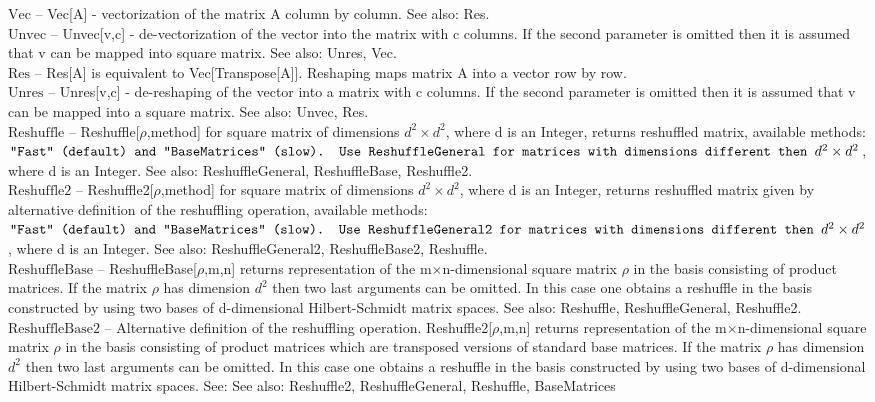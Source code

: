 \documentclass[a4paper,10pt]{scrartcl}
\begin{document}
\noindent\textbf{$ \text{Vec} $ }-- Vec[A] - vectorization of the matrix A column by column. See also: Res.$  $\\[8pt]
\noindent\textbf{$ \text{Unvec} $ }-- Unvec[v,c] - de-vectorization of the vector into the matrix with c columns. If the second parameter is omitted then it is assumed that v can be mapped into square matrix. See also: Unres, Vec.$  $\\[8pt]
\noindent\textbf{$ \text{Res} $ }-- Res[A] is equivalent to Vec[Transpose[A]]. Reshaping maps matrix A into a vector row by row.$  $\\[8pt]
\noindent\textbf{$ \text{Unres} $ }-- Unres[v,c] - de-reshaping of the vector into a matrix with c columns. If the second parameter is omitted then it is assumed that v can be mapped into a square matrix. See also: Unvec, Res.$  $\\[8pt]
\noindent\textbf{$ \text{Reshuffle} $ }-- Reshuffle[$\rho $,method] for square matrix of dimensions $ d^2\times d^2 $, where d is an Integer, returns reshuffled matrix, available methods: $\texttt{"$ $Fast$\texttt{"}$ (default) and $\texttt{"}$BaseMatrices$\texttt{"}$ (slow). Use ReshuffleGeneral for matrices with dimensions different then }d^2\times d^2 $, where d is an Integer. See also: ReshuffleGeneral, ReshuffleBase, Reshuffle2.$  $\\[8pt]
\noindent\textbf{$ \text{Reshuffle2} $ }-- Reshuffle2[$\rho $,method] for square matrix of dimensions $ d^2\times d^2 $, where d is an Integer, returns reshuffled matrix given by alternative definition of the reshuffling operation, available methods: $\texttt{"$ $Fast$\texttt{"}$ (default) and $\texttt{"}$BaseMatrices$\texttt{"}$ (slow). Use ReshuffleGeneral2 for matrices with dimensions different then }d^2\times d^2 $, where d is an Integer. See also: ReshuffleGeneral2, ReshuffleBase2, Reshuffle.$  $\\[8pt]
\noindent\textbf{$ \text{ReshuffleBase} $ }-- ReshuffleBase[$\rho $,m,n] returns representation of the m$\times $n-dimensional square matrix $\rho $ in the basis consisting of product matrices. If  the matrix $\rho $ has dimension $ d^2 $ then two last arguments can be omitted. In this case one obtains a reshuffle in the basis constructed by using two bases of d-dimensional Hilbert-Schmidt matrix spaces. See also: Reshuffle, ReshuffleGeneral, Reshuffle2.$  $\\[8pt]
\noindent\textbf{$ \text{ReshuffleBase2} $ }-- Alternative definition of the reshuffling operation. Reshuffle2[$\rho $,m,n] returns representation of the m$\times $n-dimensional square matrix $\rho $ in the basis consisting of product matrices which are transposed versions of standard base matrices. If the matrix $\rho $ has dimension $ d^2 $ then two last arguments can be omitted. In this case one obtains a reshuffle in the basis constructed by using two bases of d-dimensional Hilbert-Schmidt matrix spaces. See: See also: Reshuffle2, ReshuffleGeneral, Reshuffle, BaseMatrices$  $\\[8pt]
\end{document}
